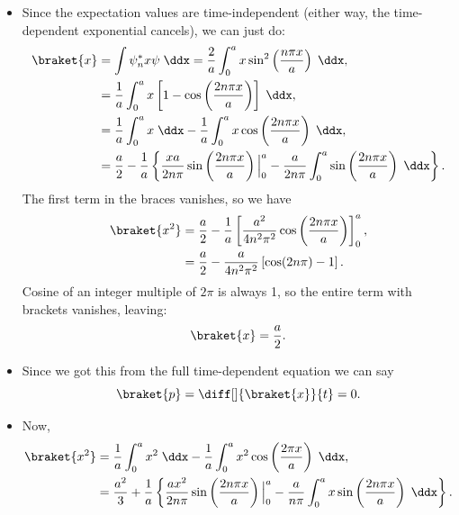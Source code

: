 \begin{example}
    \begin{itemize}
        \item Since the expectation values are time-independent (either way, the time-dependent exponential cancels), we can just do:
            \begin{align*}
                \braket{x} &= \int \psi_n^* x \psi \;\ddx = \frac{2}{a}\int_0^a x \sin^2\left(\frac{n\pi x}{a}\right) \;\ddx, \\
                &= \frac{1}{a} \int_0^a x \left[1 - \cos\left(\frac{2n\pi x}{a}\right)\right]\;\ddx, \\
                &= \frac{1}{a}\int_0^a x\;\ddx - \frac{1}{a}\int_0^a x\cos\left(\frac{2n\pi x}{a}\right)\;\ddx, \\
                &= \frac{a}{2} - \frac{1}{a}\left\{\frac{xa}{2n\pi}\sin\left(\frac{2n\pi x}{a}\right)\Big|_0^a - \frac{a}{2n\pi} \int_0^a \sin\left(\frac{2n\pi x}{a}\right)\;\ddx\right\}.
            \end{align*}
            The first term in the braces vanishes, so we have
            \begin{align*}
                \braket{x^2} &= \frac{a}{2} - \frac{1}{a} \left[\frac{a^2}{4n^2\pi^2} \cos\left(\frac{2n\pi x}{a}\right)\right]_0^a, \\
                &= \frac{a}{2} - \frac{a}{4n^2\pi^2}\left[\cos(2n\pi)-1\right].
            \end{align*}
            Cosine of an integer multiple of $2\pi$ is always 1, so the entire term with brackets vanishes, leaving:
            \begin{equation*}
                \braket{x} = \frac{a}{2}.
            \end{equation*}
        \item Since we got this from the full time-dependent equation we can say
            \begin{equation*}
                \braket{p} = \diff[]{\braket{x}}{t} = 0.
            \end{equation*}
        \item Now,
            \begin{align*}
                \braket{x^2} &= \frac{1}{a}\int_0^a x^2\;\ddx - \frac{1}{a} \int_0^a x^2\cos\left(\frac{2\pi x}{a}\right)\;\ddx, \\
                &= \frac{a^2}{3} + \frac{1}{a} \left\{\frac{ax^2}{2n\pi}\sin\left(\frac{2n\pi x}{a}\right)\Big|_0^a - \frac{a}{n\pi}\int_0^a x\sin\left(\frac{2n\pi x}{a}\right) \;\ddx\right\}.
            \end{align*}

\end{itemize}
\end{example}
